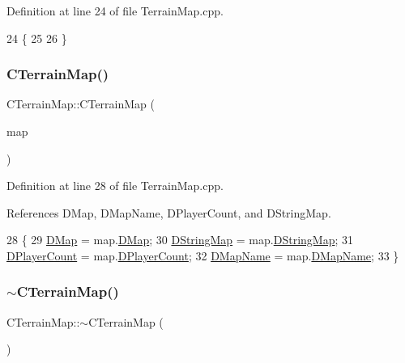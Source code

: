 Definition at line 24 of file Terrain\+Map.\+cpp.


\begin{DoxyCode}
24                         \{
25 
26 \}
\end{DoxyCode}
\hypertarget{classCTerrainMap_a9c98a824cf26ee35735a632472ca7ffd}{}\label{classCTerrainMap_a9c98a824cf26ee35735a632472ca7ffd} 
\subsubsection{\texorpdfstring{C\+Terrain\+Map()}{CTerrainMap()}\hspace{0.1cm}{\footnotesize\ttfamily [2/2]}}
{\footnotesize\ttfamily C\+Terrain\+Map\+::\+C\+Terrain\+Map (\begin{DoxyParamCaption}\item[{const \hyperlink{classCTerrainMap}{C\+Terrain\+Map} \&}]{map }\end{DoxyParamCaption})}



Definition at line 28 of file Terrain\+Map.\+cpp.



References D\+Map, D\+Map\+Name, D\+Player\+Count, and D\+String\+Map.


\begin{DoxyCode}
28                                               \{
29     \hyperlink{classCTerrainMap_a80d154ce478948b10473534a7bca13f6}{DMap} = map.\hyperlink{classCTerrainMap_a80d154ce478948b10473534a7bca13f6}{DMap};
30     \hyperlink{classCTerrainMap_a76db5fd05e22e0aea413f49175f9c282}{DStringMap} = map.\hyperlink{classCTerrainMap_a76db5fd05e22e0aea413f49175f9c282}{DStringMap};
31     \hyperlink{classCTerrainMap_a79e2cf566ac9dfbaddd2c73ea256785b}{DPlayerCount} = map.\hyperlink{classCTerrainMap_a79e2cf566ac9dfbaddd2c73ea256785b}{DPlayerCount};
32     \hyperlink{classCTerrainMap_a9026e4a5f073885b9e9fc3b43e93caa6}{DMapName} = map.\hyperlink{classCTerrainMap_a9026e4a5f073885b9e9fc3b43e93caa6}{DMapName};
33 \}
\end{DoxyCode}
\hypertarget{classCTerrainMap_a7e7b02ec0a42ca686fc895d0923567b3}{}\label{classCTerrainMap_a7e7b02ec0a42ca686fc895d0923567b3} 
\subsubsection{\texorpdfstring{$\sim$\+C\+Terrain\+Map()}{~CTerrainMap()}}
{\footnotesize\ttfamily C\+Terrain\+Map\+::$\sim$\+C\+Terrain\+Map (\begin{DoxyParamCaption}{ }\end{DoxyParamCaption})}



